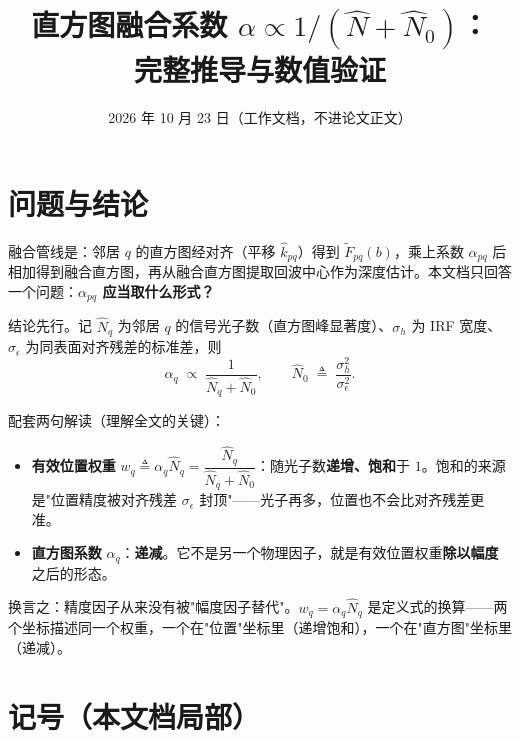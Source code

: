 \documentclass[11pt]{ctexart}
\title{直方图融合系数 $\alpha\propto 1/(\hat N+\hat N_0)$：\\完整推导与数值验证}
\date{2026 年 10 月 23 日（工作文档，不进论文正文）}
\begin{document}
\maketitle

\section{问题与结论}

融合管线是：邻居 $q$ 的直方图经对齐（平移 $\hat k_{pq}$）得到 $\widetilde F_{pq}(b)$，乘上系数 $\alpha_{pq}$ 后相加得到融合直方图，再从融合直方图提取回波中心作为深度估计。本文档只回答一个问题：\textbf{$\alpha_{pq}$ 应当取什么形式？}

结论先行。记 $\hat N_q$ 为邻居 $q$ 的信号光子数（直方图峰显著度）、$\sigma_h$ 为 IRF 宽度、$\sigma_\epsilon$ 为同表面对齐残差的标准差，则
\begin{equation}
  \alpha_q\;\propto\;\frac{1}{\hat N_q+\hat N_0},
  \qquad
  \hat N_0\;\triangleq\;\frac{\sigma_h^2}{\sigma_\epsilon^2}.
  \label{eq:conclusion}
\end{equation}

配套两句解读（理解全文的关键）：
\begin{itemize}
  \item \textbf{有效位置权重} $w_q\triangleq\alpha_q\hat N_q=\dfrac{\hat N_q}{\hat N_q+\hat N_0}$：随光子数\textbf{递增、饱和}于 $1$。饱和的来源是"位置精度被对齐残差 $\sigma_\epsilon$ 封顶"——光子再多，位置也不会比对齐残差更准。
  \item \textbf{直方图系数} $\alpha_q$：\textbf{递减}。它不是另一个物理因子，就是有效位置权重\textbf{除以幅度}之后的形态。
\end{itemize}

换言之：精度因子从来没有被"幅度因子替代"。$w_q=\alpha_q\hat N_q$ 是定义式的换算——两个坐标描述同一个权重，一个在"位置"坐标里（递增饱和），一个在"直方图"坐标里（递减）。

\section{记号（本文档局部）}
\end{document}
